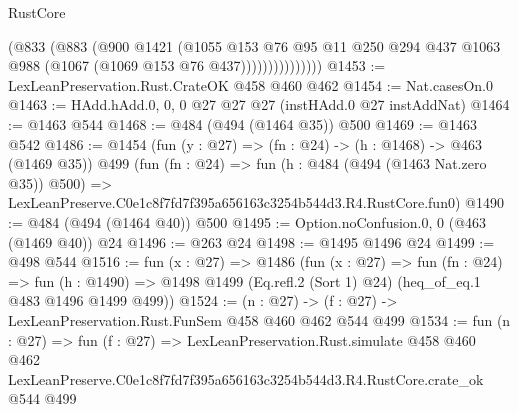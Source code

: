 \begin{lexlean}{RustCore}
\begin{coremodule}
                      (@833
                        (@883
                          (@900
                            @1421
                            (@1055
                              @153
                              @76
                              @95
                              @11
                              @250
                              @294
                              @437
                              @1063
                              @988
                              (@1067 (@1069 @153 @76 @437)))))))))))))))
@1453 := LexLeanPreservation.Rust.CrateOK @458 @460 @462
@1454 := Nat.casesOn.{0}
@1463 := HAdd.hAdd.{0, 0, 0} @27 @27 @27 (instHAdd.{0} @27 instAddNat)
@1464 := @1463 @544
@1468 := @484 (@494 (@1464 @35)) @500
@1469 := @1463 @542
@1486 := @1454
    (fun (y : @27) => (fn : @24) -> (h : @1468) -> @463 (@1469 @35))
    @499
    (fun (fn : @24) =>
    fun (h : @484 (@494 (@1463 Nat.zero @35)) @500) =>
    LexLeanPreserve.C0e1c8f7fd7f395a656163c3254b544d3.R4.RustCore.fun0)
@1490 := @484 (@494 (@1464 @40)) @500
@1495 := Option.noConfusion.{0, 0} (@463 (@1469 @40)) @24
@1496 := @263 @24
@1498 := @1495 @1496 @24
@1499 := @498 @544
@1516 := fun (x : @27) =>
  @1486
    (fun (x : @27) =>
    fun (fn : @24) =>
    fun (h : @1490) => @1498 @1499 (Eq.refl.{2} (Sort 1) @24) (heq_of_eq.{1} @483 @1496 @1499 @499))
@1524 := (n : @27) -> (f : @27) -> LexLeanPreservation.Rust.FunSem @458 @460 @462 @544 @499
@1534 := fun (n : @27) =>
  fun (f : @27) =>
  LexLeanPreservation.Rust.simulate
    @458
    @460
    @462
    LexLeanPreserve.C0e1c8f7fd7f395a656163c3254b544d3.R4.RustCore.crate_ok
    @544
    @499
\end{coremodule}
\end{lexlean}
